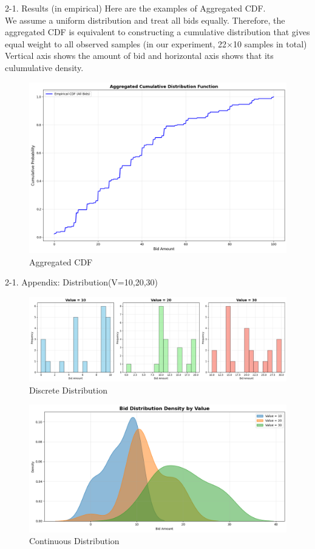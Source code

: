 \documentclass{beamer}
\begin{document}
\begin{frame}{2-1. Results (in empirical)}
Here are the examples of Aggregated CDF.\\
We assume a uniform distribution and treat all bids equally.
Therefore, the aggregated CDF is equivalent to constructing a cumulative distribution that gives equal weight to all observed samples (in our experiment, 22×10 samples in total)\\
Vertical axis shows the amount of bid and horizontal axis shows that its culumulative density.
\begin{figure}
    \centering
    \includegraphics[width=0.4\linewidth]{332Project1//figures/AggregatedCDF.png}
    \caption{Aggregated CDF}
    \label{fig:placeholder}
\end{figure}
\end{frame}

\begin{frame}{2-1. Appendix: Distribution(V=10,20,30)}
    \begin{figure}
        \centering
        \includegraphics[width=0.7\linewidth]{332Project1/figures/barplot.png}
        \caption{Discrete Distribution}
        \label{fig:placeholder}
    \end{figure}
    \begin{figure}
        \centering
        \includegraphics[width=0.5\linewidth]{332Project1/figures/Distribution.png}
        \caption{Continuous Distribution}
        \label{fig:placeholder}
    \end{figure}
\end{frame}
\end{document}
